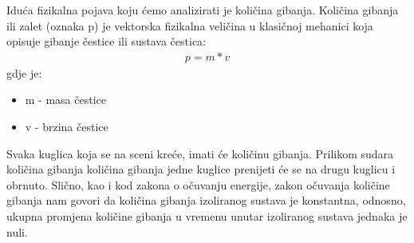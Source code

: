Iduća fizikalna pojava koju ćemo analizirati je količina gibanja. Količina gibanja ili zalet (oznaka p) je vektorska fizikalna veličina u klasičnoj mehanici koja opisuje gibanje čestice ili sustava čestica\cite{12}:
\begin{equation}\label{equ:impuls}
\begin{aligned}
	p = m * v
\end{aligned}
\end{equation}
gdje je:
\begin{itemize}
	\item m - masa čestice
	\item v - brzina čestice
\end{itemize}
Svaka kuglica koja se na sceni kreće, imati će količinu gibanja. Prilikom sudara količina gibanja količina gibanja jedne kuglice prenijeti će se na drugu kuglicu i obrnuto. Slično, kao i kod zakona o očuvanju energije, zakon očuvanja količine gibanja nam govori da količina gibanja izoliranog sustava je konstantna, odnosno, ukupna promjena količine gibanja u vremenu unutar izoliranog sustava jednaka je nuli\cite{12}.

